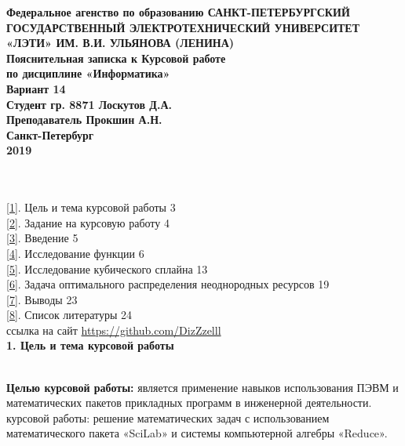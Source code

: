 \documentclass[russian,utf8,nocolumnxxxi,nocolumnxxxii]{eskdtext}
\begin{document}
\bf{\centering Федеральное агенство по образованию
САНКТ-ПЕТЕРБУРГСКИЙ ГОСУДАРСТВЕННЫЙ
ЭЛЕКТРОТЕХНИЧЕСКИЙ УНИВЕРСИТЕТ 
«ЛЭТИ» ИМ. В.И. УЛЬЯНОВА (ЛЕНИНА)\\[4cm]


Пояснительная записка к Курсовой работе\\[0.2cm]
по дисциплине «Информатика»\\[0.6cm]
Вариант 14\\[6cm]

Студент гр. 8871 \hspace{4cm}		Лоскутов Д.А.\\[0.4cm]
Преподаватель \hspace{4cm}		Прокшин А.Н.\\[1.5cm]


Санкт-Петербург\\[0.3cm]
2019\\}


\newpage

\\{}
\\\ref{1}. Цель и тема курсовой работы \hspace{9cm} 3
\\\ref{2}. Задание на курсовую работу \hspace{9.5cm} 4
\\\ref{3}. Введение \hspace{14.5cm} 5 
\\\ref{4}. Исследование функции \hspace{11cm} 6
\\\ref{5}. Исследование кубического сплайна \hspace{8cm}13
\\\ref{6}. Задача оптимального распределения неоднородных ресурсов \hspace{1cm} 19
\\\ref{7}. Выводы \hspace{14.5cm} 23
\\\ref{8}. Список литературы \hspace{11.5cm} 24\\[14cm]
ссылка на сайт \href{https://github.com/DizZzelll}{https://github.com/DizZzelll}
\newpage
\begin{equation}\label{1}
\end{equation}
 {\large\bf 1. Цель и тема курсовой работы}

\\{\bf{Целью курсовой работы:}} является применение навыков использования ПЭВМ и математических пакетов прикладных программ в инженерной деятельности.
\\{ курсовой работы:} решение математических задач с использованием математического пакета «SciLab» и системы компьютерной алгебры «Reduce».
\end{document}
